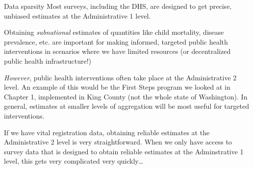 \documentclass[10pt,t]{beamer}
\begin{document}
\begin{frame}{Data sparsity}
Most surveys, including the DHS, are designed to get precise, unbiased estimates at the Administrative 1 level. 

\vspace{0.3cm}

Obtaining \textit{subnational} estimates of quantities like child mortality, disease prevalence, etc. are important for making informed, targeted public health interventions in scenarios where we have limited resources (or decentralized public health infrastructure!)

\vspace{0.3cm}

\textit{However}, public health interventions often take place at the Administrative 2 level. An example of this would be the First Steps program we looked at in Chapter 1, implemented in King County (not the whole state of Washington). In general, estimates at smaller levels of aggregation will be most useful for targeted interventions. 

\vspace{0.3cm}

\pause If we have vital registration data, obtaining reliable estimates at the Administrative 2 level is very straightforward. When we only have access to survey data that is designed to obtain reliable estimates at the Adminstrative 1 level, this gets very complicated very quickly\dots
\end{frame}
\end{document}
